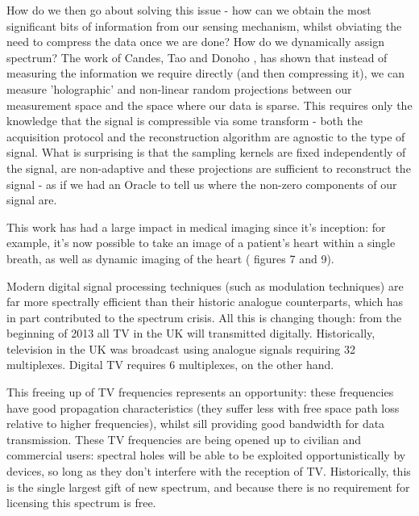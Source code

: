 How do we then go about solving this issue - how can we obtain the most significant bits of information from our sensing mechanism, whilst obviating the need to compress the data once we are done? How do we dynamically assign spectrum? The work of Candes, Tao \cite{Candes2006} and Donoho \cite{Donoho2006}, has shown that instead of measuring the information we require directly (and then compressing it), we can measure 'holographic' and non-linear random projections between our measurement space and the space where our data is sparse. This requires only the knowledge that the signal is compressible via some transform - both the acquisition protocol and the reconstruction algorithm are agnostic to the type of signal. What is surprising is that the sampling kernels are fixed independently of the signal, are non-adaptive and these projections are sufficient to reconstruct the signal - as if we had an Oracle to tell us where the non-zero components of our signal are. 

This work has had a large impact in medical imaging since it's inception: for example, it's now possible to take an image of a patient's heart within a single breath, as well as dynamic imaging of the heart (\cite{Donoho} figures 7 and 9).

Modern digital signal processing techniques (such as modulation techniques) are far more spectrally efficient than their historic analogue counterparts, which has in part contributed to the spectrum crisis. All this is changing though: from the beginning of 2013 all TV in the UK will transmitted digitally. Historically, television in the UK was broadcast using analogue signals requiring 32 multiplexes. Digital TV requires 6 multiplexes, on the other hand. 

This freeing up of TV frequencies represents an opportunity: these frequencies have good propagation characteristics (they suffer less with free space path loss relative to higher frequencies), whilst sill providing good bandwidth for data transmission. These TV frequencies are being opened up to civilian and  commercial users: spectral holes will be able to be exploited opportunistically by devices, so long as they don't interfere with the reception of TV. Historically, this is the single largest gift of new spectrum, and because there is no requirement for licensing this spectrum is free.

